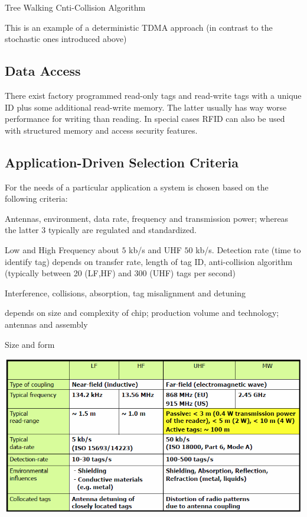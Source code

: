 \documentclass{article}
\newlength{\wideitemsep}
\let\olditem\item
\renewcommand{\item}{\setlength{\itemsep}{\wideitemsep}\olditem}
\begin{document}
\begin{multicols}{2}
\begin{algorithm}[H]
    \caption{Tree Walking Cnti-Collision Algorithm}
\end{algorithm}

This is an example of a deterministic TDMA approach (in contrast to the
stochastic ones introduced above)


\subsection{Data Access}
There exist factory programmed read-only tags and read-write tags with a unique
ID plus some additional read-write memory. The latter usually has way worse
performance for writing than reading. In special cases RFID can also be used
with structured memory and access security features.


\subsection{Application-Driven Selection Criteria}
For the needs of a particular application a system is chosen based on the
following criteria:

\begin{description}
\item[Read Range] Antennas, environment, data rate, frequency and transmission
power; whereas the latter 3 typically are regulated and standardized.
\item[Data Transfer and Detection Rates] Low and High Frequency about $5$ kb/s
and UHF $50$ kb/s. Detection rate (time to identify tag) depends on transfer
rate, length of tag ID, anti-collision algorithm (typically between 20 (LF,HF)
and 300 (UHF) tags per second)
\item[Suspectivility to Noise and other Error Sources] Interference, collisions,
absorption, tag misalignment and detuning
\item[Cost] depends on size and complexity of chip; production volume and
technology; antennas and assembly
\item[Tag Form Factors] Size and form
\end{description}

\includegraphics[width=0.9\linewidth]{rfid-properties-overview}


\end{multicols}
\end{document}
